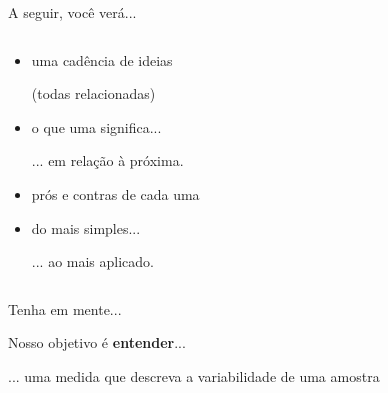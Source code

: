 \documentclass{beamer}
\begin{document}
\begin{frame}{\scriptsize A seguir, você verá...}
  \begin{columns}
    \begin{column}{5cm}
      \begin{itemize}
        \scriptsize
      \item uma cadência de ideias

        (todas relacionadas)
        \bigskip
      \item o que uma significa...

        ... em relação à próxima.
        \bigskip
      \item prós e contras de cada uma
        \bigskip
      \item do mais \alert{simples}...

        ... ao mais \alert{aplicado}.
      \end{itemize}
    \end{column}
    \begin{column}{5cm}
    \end{column}
  \end{columns}
\end{frame}

\begin{frame}[label=objetivo]{\scriptsize Tenha em mente...}
  \begin{center}
    Nosso objetivo é {\bf entender}...

    \bigskip
    {\footnotesize
      ... uma medida que descreva a variabilidade de uma amostra
    }
  \end{center}
\end{frame}
\end{document}
